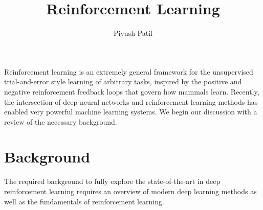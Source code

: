 \documentclass{article}
\begin{document}
\title{Reinforcement Learning}
\author{Piyush Patil}
\maketitle

Reinforcement learning is an extremely general framework for the unsupervised trial-and-error style learning of arbitrary tasks, inspired by the positive and negative reinforcement feedback loops that govern how mammals learn. Recently, the intersection of deep neural networks and reinforcement learning methods has enabled very powerful machine learning systems. We begin our discussion with a review of the necessary background.

\section{Background}
The required background to fully explore the state-of-the-art in deep reinforcement learning requires an overview of modern deep learning methods as well as the fundamentals of reinforcement learning.
\end{document}
